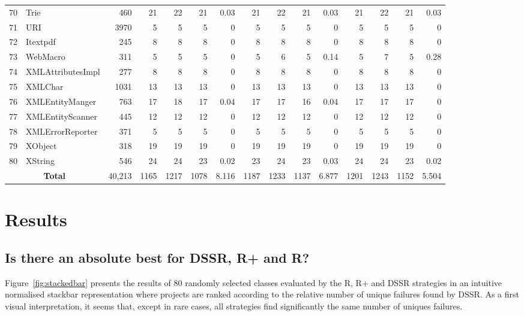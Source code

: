 \documentclass{acm_proc_article-sp}
\begin{document}
\begin{table} [htp!]
{\begin{tabularx}{1.17 \textwidth}{r l r r r r r r r r r r r r r}
 70						& Trie						&460		& 21		&	22	&	21	& 	0.03					& 21		&  22		& 21		& 		0.03			& 21			& 22			& 21			&	0.03\\      
 71						& URI						&3970		& 5 		&	5	&	5	& 	0					& 5		&  5		& 5		& 		0			& 5			& 5			& 5			&	0\\      
 72						& Itextpdf					&245		& 8		&	8	&	8	& 	0					& 8		&  8		& 8		& 		0			& 8			& 8			& 8			&	0\\      
 73						& WebMacro					&311		& 5		&	5	&	5	& 	0					& 5		&  6		& 5		& 		0.14			& 5			& 7			& 5			&	0.28\\      
 74						& XMLAttributesImpl			&277		& 8		&	8	&	8	& 	0					& 8		&  8		& 8		& 		0			& 8			& 8			& 8			&	0\\      
 75						& XMLChar					&1031		& 13		&	13	&	13	& 	0					& 13		&  13		& 13		& 		0			& 13			& 13			& 13			&	0\\      
 76						& XMLEntityManger				&763		& 17		&	18	&	17	& 	0.04					& 17		&  17		& 16		& 		0.04			& 17			& 17			& 17			&	0\\      
 77						& XMLEntityScanner			&445		& 12		&	12	&	12	& 	0					& 12		&  12		& 12		& 		0			& 12			& 12			& 12			&	0\\      
 78						& XMLErrorReporter			&371		& 5		&	5	&	5	& 	0					& 5		&  5		& 5		& 		0			& 5			& 5			& 5			&	0\\      
 79						& XObject					&318		& 19		&	19	&	19	& 	0					& 19		&  19		& 19		& 		0			& 19			& 19			& 19			&	0\\      
 80						& XString					&546		& 24		&	24	&	23	& 	0.02					& 23		&  24		& 23		& 		0.03			& 24			& 24			& 23			&	0.02\\      

    						\multicolumn{2}{c}{\textbf{Total}}	&40,213	&1165		&	1217	&    1078	&	8.116					& 1187	&1233		&1137		&		6.877			& 1201		& 1243		& 1152		& 	5.504\\
     \end{tabularx} }
    \bigskip
    \label{table:Results}
\end{table}

\section{Results}\label{sec:res}




\subsection{Is there an absolute best for DSSR, R+ and R?}
Figure~\ref{fig:stackedbar} presents the results of 80 randomly selected classes evaluated by the R, R+ and DSSR strategies in an intuitive normalised stackbar representation where projects are ranked according to the relative number of unique failures found by DSSR. As a first visual interpretation, it seems that, except in rare cases, all strategies find significantly the same number of uniques failures.
\end{document}

